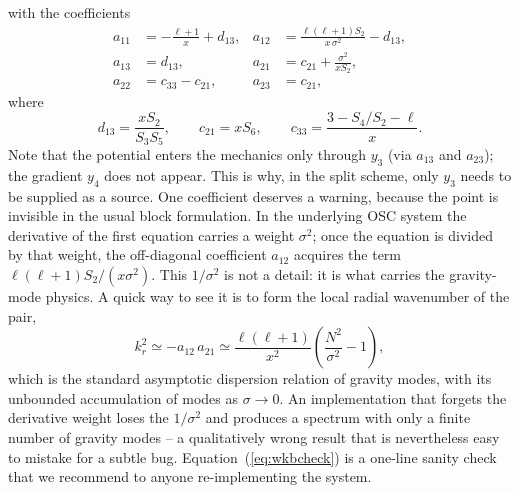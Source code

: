 \documentclass[]{aa}
\begin{document}
with the coefficients
\begin{align}
  a_{11} &= -\frac{\ell+1}{x}+d_{13}, &
  a_{12} &= \frac{\ell(\ell+1)S_2}{x\,\sigma^2}-d_{13}, \nonumber\\
  a_{13} &= d_{13}, &
  a_{21} &= c_{21}+\frac{\sigma^2}{xS_2}, \nonumber\\
  a_{22} &= c_{33}-c_{21}, &
  a_{23} &= c_{21},
  \label{eq:coeffs}
\end{align}
where
\begin{equation}
  d_{13}=\frac{xS_2}{S_3S_5},\qquad
  c_{21}=xS_6,\qquad
  c_{33}=\frac{3-S_4/S_2-\ell}{x}.
\end{equation}
Note that the potential enters the mechanics only through $y_3$ (via $a_{13}$ and $a_{23}$); the gradient $y_4$ does not appear.  This is why, in the split scheme, only $y_3$ needs to be supplied as a source. One coefficient deserves a warning, because the point is invisible in the usual block formulation.  In the underlying OSC system the derivative of the first equation carries a weight $\sigma^2$; once the equation is divided by that weight, the off-diagonal coefficient $a_{12}$ acquires the term $\ell(\ell+1)S_2/(x\sigma^2)$.  This $1/\sigma^2$ is not a detail: it is what carries the gravity-mode physics.  A quick way to see it is to form the local radial wavenumber of the pair,
\begin{equation}
  k_r^2 \simeq -a_{12}\,a_{21}
        \simeq \frac{\ell(\ell+1)}{x^2}
          \left(\frac{N^2}{\sigma^2}-1\right),
  \label{eq:wkbcheck}
\end{equation}
which is the standard asymptotic dispersion relation of gravity modes, with its unbounded accumulation of modes as $\sigma\to0$.  An implementation that forgets the derivative weight loses the $1/\sigma^2$ and produces a spectrum with only a finite number of gravity modes -- a qualitatively wrong result that is nevertheless easy to mistake for a subtle bug. Equation~(\ref{eq:wkbcheck}) is a one-line sanity check that we recommend to anyone re-implementing the system.
\end{document}
